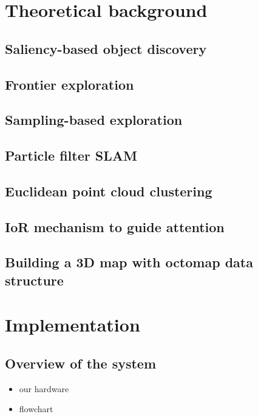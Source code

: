 \documentclass[a4paper,11pt,english]{article}
\begin{document}
\section{Theoretical background}

\subsection{Saliency-based object discovery}
\subsection{Frontier exploration}
\subsection{Sampling-based exploration}
\subsection{Particle filter SLAM}
\subsection{Euclidean point cloud clustering}
\subsection{IoR mechanism to guide attention}
\subsection{Building a 3D map with octomap data structure}

\section{Implementation}

\subsection{Overview of the system}
\begin{itemize}
	\item our hardware
	\item flowchart
\end{itemize}
\end{document}
